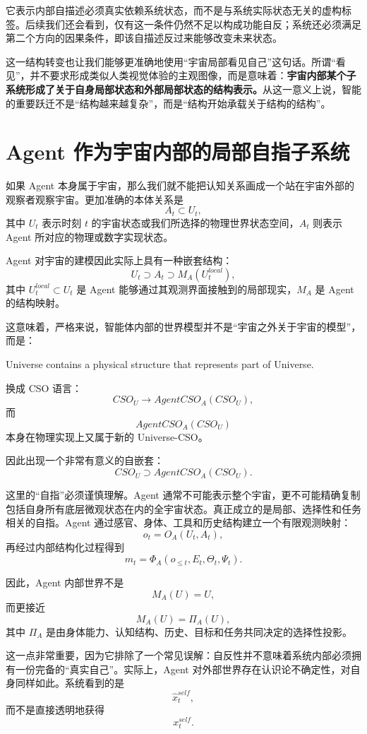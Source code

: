 它表示内部自描述必须真实依赖系统状态，而不是与系统实际状态无关的虚构标签。后续我们还会看到，仅有这一条件仍然不足以构成功能自反；系统还必须满足第二个方向的因果条件，即该自描述反过来能够改变未来状态。

这一结构转变也让我们能够更准确地使用“宇宙局部看见自己”这句话。所谓“看见”，并不要求形成类似人类视觉体验的主观图像，而是意味着：\textbf{宇宙内部某个子系统形成了关于自身局部状态和外部局部状态的结构表示。}从这一意义上说，智能的重要跃迁不是“结构越来越复杂”，而是“结构开始承载关于结构的结构”。

\section{Agent 作为宇宙内部的局部自指子系统}

如果 Agent 本身属于宇宙，那么我们就不能把认知关系画成一个站在宇宙外部的观察者观察宇宙。更加准确的本体关系是
\[
A_t\subset U_t,
\]
其中 \(U_t\) 表示时刻 \(t\) 的宇宙状态或我们所选择的物理世界状态空间，\(A_t\) 则表示 Agent 所对应的物理或数字实现状态。

Agent 对宇宙的建模因此实际上具有一种嵌套结构：
\[
U_t
\supset
A_t
\supset
M_A(U_t^{local}),
\]
其中 \(U_t^{local}\subset U_t\) 是 Agent 能够通过其观测界面接触到的局部现实，\(M_A\) 是 Agent 的结构映射。

这意味着，严格来说，智能体内部的世界模型并不是“宇宙之外关于宇宙的模型”，而是：
\begin{statementbox}
Universe contains a physical structure that represents part of Universe.
\end{statementbox}

换成 CSO 语言：
\[
CSO_U
\rightarrow
AgentCSO_A(CSO_U),
\]
而
\[
AgentCSO_A(CSO_U)
\]
本身在物理实现上又属于新的 Universe-CSO。

因此出现一个非常有意义的自嵌套：
\[
\boxed{
CSO_U
\supset
AgentCSO_A(CSO_U).
}
\]

这里的“自指”必须谨慎理解。Agent 通常不可能表示整个宇宙，更不可能精确复制包括自身所有底层微观状态在内的全宇宙状态。真正成立的是局部、选择性和任务相关的自指。Agent 通过感官、身体、工具和历史结构建立一个有限观测映射：
\[
o_t=O_A(U_t,A_t),
\]
再经过内部结构化过程得到
\[
m_t=\Phi_A(o_{\leq t},E_t,\Theta_t,\Psi_t).
\]

因此，Agent 内部世界不是
\[
M_A(U)=U,
\]
而更接近
\[
M_A(U)
=
\Pi_A(U),
\]
其中 \(\Pi_A\) 是由身体能力、认知结构、历史、目标和任务共同决定的选择性投影。

这一点非常重要，因为它排除了一个常见误解：自反性并不意味着系统内部必须拥有一份完备的“真实自己”。实际上，Agent 对外部世界存在认识论不确定性，对自身同样如此。系统看到的是
\[
\hat x_t^{self},
\]
而不是直接透明地获得
\[
x_t^{self}.
\]

